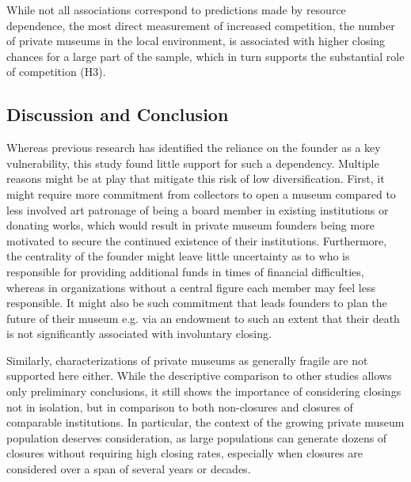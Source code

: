 \documentclass[12pt]{article}
\begin{document}
While not all associations correspond to predictions made by resource dependence, the most direct measurement of increased competition, the number of private museums in the local environment, is associated with higher closing chances for a large part of the sample, which in turn supports the substantial role of competition (H3).
\subsection*{Discussion and Conclusion}





Whereas previous research has identified the reliance on the founder as a key vulnerability, this study found little support for such a dependency.
Multiple reasons might be at play that mitigate this risk of low diversification.
First, it might require more commitment from collectors to open a museum compared to less involved art patronage of being a board member in existing institutions or donating works, which would result in private museum founders being more motivated to secure the continued existence of their institutions.
Furthermore, the centrality of the founder might leave little uncertainty as to who is responsible for providing additional funds in times of financial difficulties, whereas in organizations without a central figure each member may feel less responsible.
It might also be such commitment that leads founders to plan the future of their museum e.g. via an endowment to such an extent that their death is not significantly associated with involuntary closing.



Similarly, characterizations of private museums as generally fragile \cite{Adam_2020_close,Bechtler_Imhof_2018_future} are not supported here either.
While the descriptive comparison to other studies allows only preliminary conclusions, it still shows the importance of considering closings not in isolation, but in comparison to both non-closures and closures of comparable institutions.
In particular, the context of the growing private museum population deserves consideration, as large populations can generate dozens of closures without requiring high closing rates, especially when closures are considered over a span of several years or decades.
\end{document}
